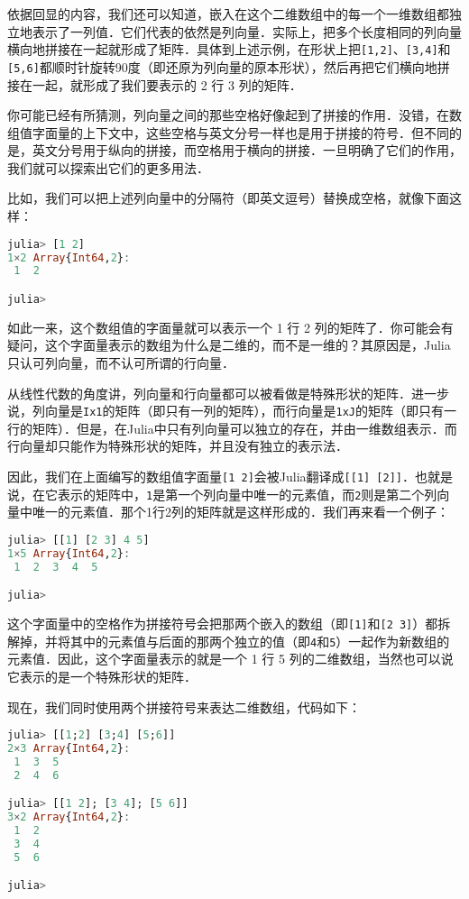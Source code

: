依据回显的内容，我们还可以知道，嵌入在这个二维数组中的每一个一维数组都独立地表示了一列值．它们代表的依然是列向量．实际上，把多个长度相同的列向量横向地拼接在一起就形成了矩阵．具体到上述示例，在形状上把\verb|[1,2]|、\verb|[3,4]|和\verb|[5,6]|都顺时针旋转90度（即还原为列向量的原本形状），然后再把它们横向地拼接在一起，就形成了我们要表示的 2 行 3 列的矩阵．

你可能已经有所猜测，列向量之间的那些空格好像起到了拼接的作用．没错，在数组值字面量的上下文中，这些空格与英文分号一样也是用于拼接的符号．但不同的是，英文分号用于纵向的拼接，而空格用于横向的拼接．一旦明确了它们的作用，我们就可以探索出它们的更多用法．

比如，我们可以把上述列向量中的分隔符（即英文逗号）替换成空格，就像下面这样：

\begin{lstlisting}[language=julia]
julia> [1 2]
1×2 Array{Int64,2}:
 1  2

julia> 
\end{lstlisting}

如此一来，这个数组值的字面量就可以表示一个 1 行 2 列的矩阵了．你可能会有疑问，这个字面量表示的数组为什么是二维的，而不是一维的？其原因是，Julia 只认可列向量，而不认可所谓的行向量．

从线性代数的角度讲，列向量和行向量都可以被看做是特殊形状的矩阵．进一步说，列向量是\verb|Ix1|的矩阵（即只有一列的矩阵），而行向量是\verb|1xJ|的矩阵（即只有一行的矩阵）．但是，在Julia中只有列向量可以独立的存在，并由一维数组表示．而行向量却只能作为特殊形状的矩阵，并且没有独立的表示法．

因此，我们在上面编写的数组值字面量\verb|[1 2]|会被Julia翻译成\verb|[[1] [2]]|．也就是说，在它表示的矩阵中，\verb|1|是第一个列向量中唯一的元素值，而\verb|2|则是第二个列向量中唯一的元素值．那个1行2列的矩阵就是这样形成的．我们再来看一个例子：

\begin{lstlisting}[language=julia]
julia> [[1] [2 3] 4 5]
1×5 Array{Int64,2}:
 1  2  3  4  5

julia> 
\end{lstlisting}

这个字面量中的空格作为拼接符号会把那两个嵌入的数组（即\verb|[1]|和\verb|[2 3]|）都拆解掉，并将其中的元素值与后面的那两个独立的值（即\verb|4|和\verb|5|）一起作为新数组的元素值．因此，这个字面量表示的就是一个 1 行 5 列的二维数组，当然也可以说它表示的是一个特殊形状的矩阵．

现在，我们同时使用两个拼接符号来表达二维数组，代码如下：

\begin{lstlisting}[language=julia]
julia> [[1;2] [3;4] [5;6]]
2×3 Array{Int64,2}:
 1  3  5
 2  4  6

julia> [[1 2]; [3 4]; [5 6]]
3×2 Array{Int64,2}:
 1  2
 3  4
 5  6

julia> 
\end{lstlisting}

